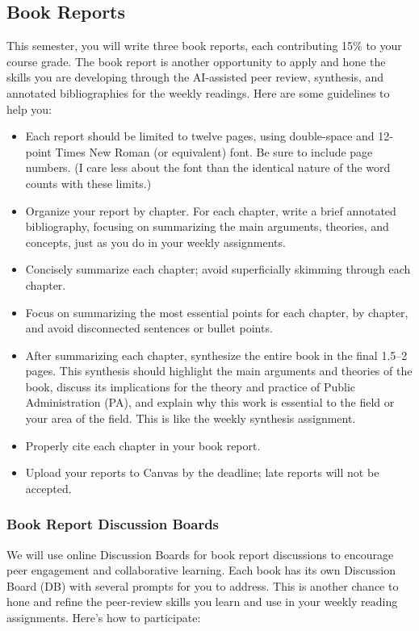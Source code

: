 \documentclass[12pt, letterpaper]{article}
\begin{document}
\subsection{Book Reports}

This semester, you will write three book reports, each contributing 15\% to your course grade. The book report is another opportunity to apply and hone the skills you are developing through the AI-assisted peer review, synthesis, and annotated bibliographies for the weekly readings. Here are some guidelines to help you:
    \begin{itemize}
        \item Each report should be limited to twelve pages, using double-space and 12-point Times New Roman (or equivalent) font. Be sure to include page numbers. (I care less about the font than the identical nature of the word counts with these limits.)
        \item Organize your report by chapter. For each chapter, write a brief annotated bibliography, focusing on summarizing the main arguments, theories, and concepts, just as you do in your weekly assignments.
        \item Concisely summarize each chapter; avoid superficially skimming through each chapter.
        \item Focus on summarizing the most essential points for each chapter, by chapter, and avoid disconnected sentences or bullet points.
        \item After summarizing each chapter, synthesize the entire book in the final 1.5–2 pages. This synthesis should highlight the main arguments and theories of the book, discuss its implications for the theory and practice of Public Administration (PA), and explain why this work is essential to the field or your area of the field. This is like the weekly synthesis assignment.
        \item Properly cite each chapter in your book report.
        \item Upload your reports to Canvas by the deadline; late reports will not be accepted.
    \end{itemize}

\subsubsection*{Book Report Discussion Boards}
We will use online Discussion Boards for book report discussions to encourage peer engagement and collaborative learning. Each book has its own Discussion Board (DB) with several prompts for you to address. This is another chance to hone and refine the peer-review skills you learn and use in your weekly reading assignments. Here’s how to participate:
\end{document}
